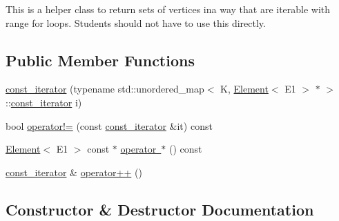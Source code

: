 This is a helper class to return sets of vertices ina way that are iterable with range for loops. Students should not have to use this directly. \subsection*{Public Member Functions}
\begin{DoxyCompactItemize}
\item 
\mbox{\hyperlink{classbridges_1_1datastructure_1_1_graph_adj_list_1_1const_vertex_element_set__listhelper_1_1const__iterator_a4b7fc58222ec911d26672daa5e255a1d}{const\+\_\+iterator}} (typename std\+::unordered\+\_\+map$<$ K, \mbox{\hyperlink{classbridges_1_1datastructure_1_1_element}{Element}}$<$ E1 $>$ $\ast$ $>$\+::\mbox{\hyperlink{classbridges_1_1datastructure_1_1_graph_adj_list_1_1const_vertex_element_set__listhelper_1_1const__iterator}{const\+\_\+iterator}} i)
\item 
bool \mbox{\hyperlink{classbridges_1_1datastructure_1_1_graph_adj_list_1_1const_vertex_element_set__listhelper_1_1const__iterator_ac30d7d7e8eb8a976f7dd193bc7cb7b1c}{operator!=}} (const \mbox{\hyperlink{classbridges_1_1datastructure_1_1_graph_adj_list_1_1const_vertex_element_set__listhelper_1_1const__iterator}{const\+\_\+iterator}} \&it) const
\item 
\mbox{\hyperlink{classbridges_1_1datastructure_1_1_element}{Element}}$<$ E1 $>$ const  $\ast$ \mbox{\hyperlink{classbridges_1_1datastructure_1_1_graph_adj_list_1_1const_vertex_element_set__listhelper_1_1const__iterator_a05e1a0e34fba417f146f3b5366e2ec90}{operator $\ast$}} () const
\item 
\mbox{\hyperlink{classbridges_1_1datastructure_1_1_graph_adj_list_1_1const_vertex_element_set__listhelper_1_1const__iterator}{const\+\_\+iterator}} \& \mbox{\hyperlink{classbridges_1_1datastructure_1_1_graph_adj_list_1_1const_vertex_element_set__listhelper_1_1const__iterator_ad778b5c8406c308e1b80700882171243}{operator++}} ()
\end{DoxyCompactItemize}


\subsection{Constructor \& Destructor Documentation}
\mbox{\label{classbridges_1_1datastructure_1_1_graph_adj_list_1_1const_vertex_element_set__listhelper_1_1const__iterator_a4b7fc58222ec911d26672daa5e255a1d}} 
